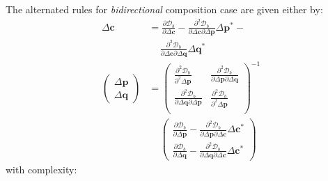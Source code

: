The alternated rules for \emph{bidirectional} composition case are given either by:
\begin{equation}
    \begin{aligned}
        \Delta \mathbf{c} & =  \frac{\partial \mathcal{D}_b}{\partial \Delta \mathbf{c}} - \frac{\partial^2 \mathcal{D}_b}{\partial \Delta \mathbf{c} \partial \Delta \mathbf{p}} \Delta \mathbf{p}^* - \\
        & \quad \, \frac{\partial^2 \mathcal{D}_b}{\partial \Delta \mathbf{c} \partial \Delta \mathbf{q}} \Delta \mathbf{q}^*
        \\
        \begin{pmatrix}
            \Delta\mathbf{p}
            \\
            \Delta\mathbf{q}
        \end{pmatrix} & =
        \begin{pmatrix}
            \frac{\partial^2 \mathcal{D}_b}{\partial^2 \Delta \mathbf{p}} & \frac{\partial^2 \mathcal{D}_b}{\partial \Delta \mathbf{p} \partial \Delta \mathbf{q}}
            \\
            \frac{\partial^2 \mathcal{D}_b}{\partial \Delta \mathbf{q} \partial \Delta \mathbf{p}} & \frac{\partial^2 \mathcal{D}_b}{\partial^2 \Delta \mathbf{p}}
            \\
        \end{pmatrix}^{-1}
        \\
        & \quad \,
        \begin{pmatrix}
            \frac{\partial \mathcal{D}_b}{\partial \Delta \mathbf{p}} - \frac{\partial^2 \mathcal{D}_b}{\partial \Delta \mathbf{p} \partial \Delta \mathbf{c}} \Delta \mathbf{c}^*
            \\
            \frac{\partial \mathcal{D}_b}{\partial \Delta \mathbf{q}} - \frac{\partial^2 \mathcal{D}_b}{\partial \Delta \mathbf{q} \partial \Delta \mathbf{c}} \Delta \mathbf{c}^*
        \end{pmatrix}
        \label{eq:bidirectional_newton_alternated_solution1}
    \end{aligned}
\end{equation}
with complexity:
